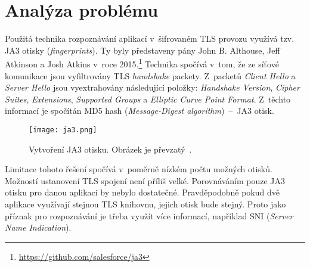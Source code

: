 
\section{Analýza problému}
\label{sec_problem_analysis}

Použitá technika rozpoznávání aplikací v~šifrovaném TLS provozu využívá tzv. JA3 otisky (\textit{fingerprints}). Ty byly představeny pány John B. Althouse, Jeff Atkinson a Josh Atkins v~roce 2015.\footnote{\url{https://github.com/salesforce/ja3}} Technika spočívá v~tom, že ze síťové komunikace jsou vyfiltrovány TLS \textit{handshake} packety. Z~packetů \textit{Client Hello} a \textit{Server Hello} jsou vyextrahovány následující položky: \textit{Handshake Version}, \textit{Cipher Suites}, \textit{Extensions}, \textit{Supported Groups} a \textit{Elliptic Curve Point Format}. Z~těchto informací je spočítán MD5 hash (\textit{Message-Digest algorithm})~--~JA3 otisk.

\begin{figure}[H]
    \centering
    \texttt{[image: ja3.png]}
    \caption{Vytvoření JA3 otisku. Obrázek je převzatý~\cite{bib_matousek}.}
    \label{fig_ja3}
\end{figure}

Limitace tohoto řešení spočívá v~poměrně nízkém počtu možných otisků. Možností ustanovení TLS spojení není příliš velké. Porovnáváním pouze JA3 otisku pro danou aplikaci by nebylo dostatečné. Pravděpodobně pokud dvě aplikace využívají stejnou TLS knihovnu, jejich otisk bude stejný. Proto jako příznak pro rozpoznávání je třeba využít více informací, například SNI (\textit{Server Name Indication}).

